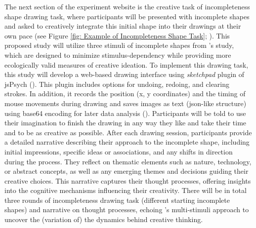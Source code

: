 \documentclass[../Proposal_Writing_Sample.tex]{subfiles}
\begin{document}
The next section of the experiment website is the creative task of incompleteness shape drawing task, where participants will be presented with incomplete shapes and asked to creatively integrate this initial shape into their drawings at their own pace (see Figure \ref{fig: Example of Incompleteness Shape Task}; \cite{patterson_audra_2023}). This proposed study will utilize three stimuli of incomplete shapes from \textcite{barbot_dynamics_2018}'s study, which are designed to minimize stimulus-dependency while providing more ecologically valid measures of creative ideation. To implement this drawing task, this study will develop a web-based drawing interface using \textit{sketchpad} plugin of jsPsych (\cite{leeuw_jspsych_2023}). This plugin includes options for undoing, redoing, and clearing strokes. In addition, it records the position (x, y coordinates) and the timing of mouse movements during drawing and saves images as text (json-like structure) using base64 encoding for later data analysis (\cite{bainbridge_tutorial_2022}). Participants will be told to use their imagination to finish the drawing in any way they like and take their time and to be as creative as possible. After each drawing session, participants provide a detailed narrative describing their approach to the incomplete shape, including initial impressions, specific ideas or associations, and any shifts in direction during the process. They reflect on thematic elements such as nature, technology, or abstract concepts, as well as any emerging themes and decisions guiding their creative choices. This narrative captures their thought processes, offering insights into the cognitive mechanisms influencing their creativity. There will be in total three rounds of incompleteness drawing task (different starting incomplete shapes) and narrative on thought processes, echoing \textcite{barbot_dynamics_2018}'s multi-stimuli approach to uncover the (variation of) the dynamics behind creative thinking.
\end{document}
